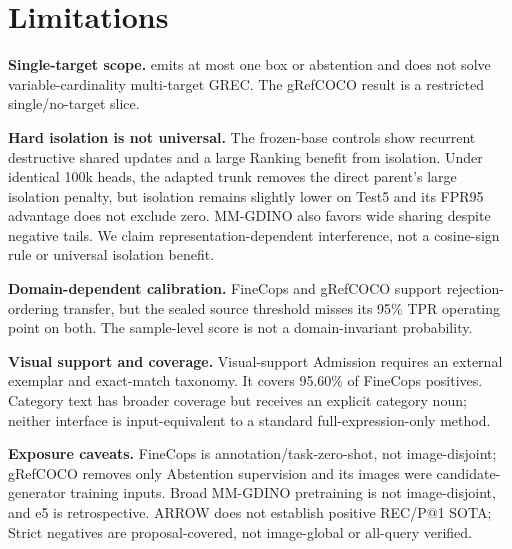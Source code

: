 \section{Limitations}
\label{sec:limitations}

\textbf{Single-target scope.}
\method emits at most one box or abstention and does not solve
variable-cardinality multi-target GREC.  The gRefCOCO result is a restricted
single/no-target slice.

\textbf{Hard isolation is not universal.}
The frozen-base controls show recurrent destructive shared updates and a large
Ranking benefit from isolation.  Under identical 100k heads, the adapted trunk removes the
direct parent's large isolation penalty, but isolation remains slightly lower
on Test5 and its FPR95 advantage does not exclude zero.  MM-GDINO also favors
wide sharing despite negative tails.  We claim representation-dependent
interference, not a cosine-sign rule or universal isolation benefit.

\textbf{Domain-dependent calibration.}
FineCops and gRefCOCO support rejection-ordering transfer, but the sealed source
threshold misses its 95\% TPR operating point on both.  The sample-level score
is not a domain-invariant probability.

\textbf{Visual support and coverage.}
Visual-support Admission requires an external exemplar and exact-match
taxonomy.  It covers 95.60\% of FineCops positives.  Category text has broader
coverage but receives an explicit category noun; neither interface is
input-equivalent to a standard full-expression-only method.

\textbf{Exposure caveats.}
FineCops is annotation/task-zero-shot, not image-disjoint; gRefCOCO removes
only Abstention supervision and its images were candidate-generator training
inputs.  Broad MM-GDINO pretraining is not image-disjoint, and e5 is
retrospective.  ARROW does not establish positive REC/P@1 SOTA; Strict
negatives are proposal-covered, not image-global or all-query verified.
